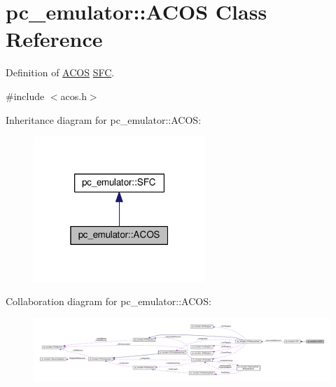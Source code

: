 \hypertarget{classpc__emulator_1_1ACOS}{}\section{pc\+\_\+emulator\+:\+:A\+C\+OS Class Reference}
\label{classpc__emulator_1_1ACOS}


Definition of \hyperlink{classpc__emulator_1_1ACOS}{A\+C\+OS} \hyperlink{classpc__emulator_1_1SFC}{S\+FC}.  




{\ttfamily \#include $<$acos.\+h$>$}



Inheritance diagram for pc\+\_\+emulator\+:\+:A\+C\+OS\+:
\nopagebreak
\begin{figure}[H]
\begin{center}
\leavevmode
\includegraphics[width=184pt]{classpc__emulator_1_1ACOS__inherit__graph}
\end{center}
\end{figure}


Collaboration diagram for pc\+\_\+emulator\+:\+:A\+C\+OS\+:
\nopagebreak
\begin{figure}[H]
\begin{center}
\leavevmode
\includegraphics[width=350pt]{classpc__emulator_1_1ACOS__coll__graph}
\end{center}
\end{figure}
